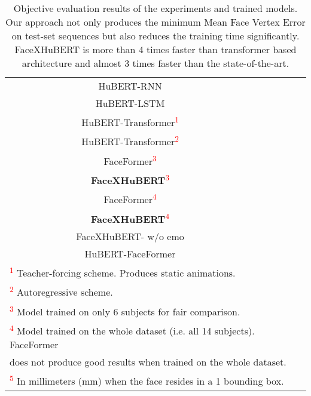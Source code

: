 \documentclass[10pt,twocolumn,letterpaper]{article}
\begin{document}
\begin{table}[t]
\begin{tabular}{c c c c}
    HuBERT-RNN &  & \\
    HuBERT-LSTM &   & \\
    HuBERT-Transformer\textsuperscript{\textcolor{red}{1}} &  & \\
    HuBERT-Transformer\textsuperscript{\textcolor{red}{2}} &  & \\
    FaceFormer\textsuperscript{\textcolor{red}{3}} &  & \\ \textbf{FaceXHuBERT}\textsuperscript{\textcolor{red}{3}} &  & \\
    FaceFormer\textsuperscript{\textcolor{red}{4}} &  & \\
    \textbf{FaceXHuBERT}\textsuperscript{\textcolor{red}{4}} &  & \\
    FaceXHuBERT- w/o emo &  & \\
    HuBERT-FaceFormer &  & \\
    \bottomrule
    \multicolumn{3}{l}{\footnotesize \textsuperscript{\textcolor{red}{1}} Teacher-forcing scheme. Produces static animations.}\\
    \multicolumn{3}{l}{\footnotesize \textsuperscript{\textcolor{red}{2}} Autoregressive scheme.}\\
    \multicolumn{3}{l}{\footnotesize \textsuperscript{\textcolor{red}{3}} Model trained on only 6 subjects for fair comparison.}\\
    \multicolumn{3}{l}{\footnotesize \textsuperscript{\textcolor{red}{4}} Model trained on the whole dataset (i.e. all 14 subjects). FaceFormer }\\
    \multicolumn{3}{l}{\footnotesize does not produce good results when trained on the whole dataset.}\\
    \multicolumn{3}{l}{\footnotesize \textsuperscript{\textcolor{red}{5}} In millimeters (mm) when the face resides in a 1 bounding box.}
  \end{tabular}
  \caption{Objective evaluation results of the experiments and trained models. Our approach not only produces the minimum Mean Face Vertex Error on test-set sequences but also reduces the training time significantly. FaceXHuBERT is more than 4 times faster than transformer based architecture and almost 3 times faster than the state-of-the-art.}
  \label{tab:Obj_evaluation}
  \vspace{-5mm}
\end{table}
\endgroup
\end{document}
